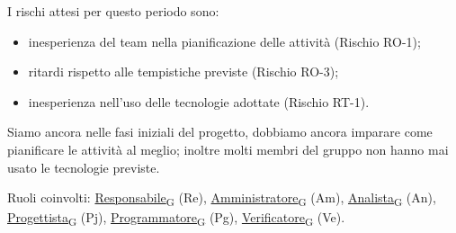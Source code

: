 I rischi attesi per questo periodo sono:
\begin{itemize}
	\item inesperienza del team nella pianificazione delle attività (Rischio RO-1);
	\item ritardi rispetto alle tempistiche previste (Rischio RO-3);
	\item inesperienza nell'uso delle tecnologie adottate (Rischio RT-1).
\end{itemize}
Siamo ancora nelle fasi iniziali del progetto, dobbiamo ancora imparare come pianificare le attività al meglio; inoltre molti membri del gruppo non hanno mai usato le tecnologie previste.

Ruoli coinvolti: \href{https://7last.github.io/docs/rtb/documentazione-interna/glossario\#responsabile}{Responsabile\textsubscript{G}} (Re), \href{https://7last.github.io/docs/rtb/documentazione-interna/glossario\#amministratore}{Amministratore\textsubscript{G}} (Am), \href{https://7last.github.io/docs/rtb/documentazione-interna/glossario\#analista}{Analista\textsubscript{G}} (An), \href{https://7last.github.io/docs/rtb/documentazione-interna/glossario\#progettista}{Progettista\textsubscript{G}} (Pj), \href{https://7last.github.io/docs/rtb/documentazione-interna/glossario\#programmatore}{Programmatore\textsubscript{G}} (Pg), \href{https://7last.github.io/docs/rtb/documentazione-interna/glossario\#verificatore}{Verificatore\textsubscript{G}} (Ve).

